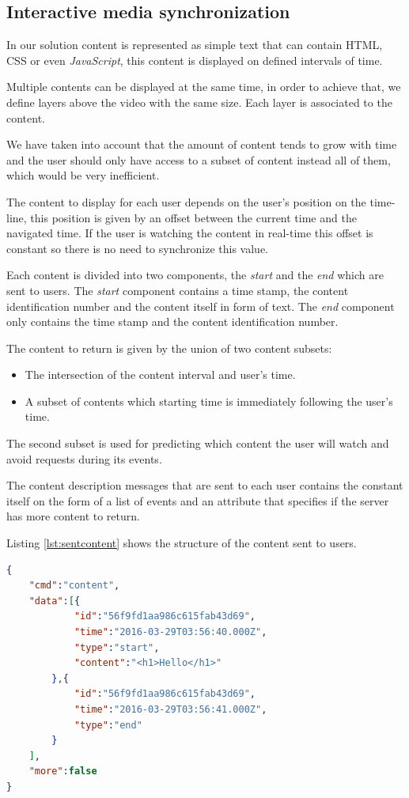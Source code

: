 	\subsection{Interactive media synchronization}

	In our solution content is represented as simple text that can contain \ac{HTML}, \ac{CSS} or even \emph{JavaScript}, this content is displayed on defined intervals of time.

	Multiple contents can be displayed at the same time, in order to achieve that, we define layers above the video with the same size. Each layer is associated to the content.

	We have taken into account that the amount of content tends to grow with time and the user should only have access to a subset of content instead all of them, which would be very inefficient.

	The content to display for each user depends on the user's position on the time-line, this position is given by an offset between the current time and the navigated time. If the user is watching the content in real-time this offset is constant so there is no need to synchronize this value.

	Each content is divided into two components, the \emph{start} and the \emph{end} which are sent to users. The \emph{start} component contains a time stamp, the content identification number and the content itself in form of text. The \emph{end} component only contains the time stamp and the content identification number. 

	The content to return is given by the union of two content subsets:
	\begin{itemize}
		\item The intersection of the content interval and user's time.
		\item A subset of contents which starting time is immediately following the user's time.
	\end{itemize}

	The second subset is used for predicting which content the user will watch and avoid requests during its events.

	The content description messages that are sent to each user contains the constant itself on the form of a list of events and an attribute that specifies if the server has more content to return.

	Listing \ref{lst:sentcontent} shows the structure of the content sent to users.

\begin{minipage}{\linewidth}
\begin{lstlisting}[caption={Exampe of content sent to users},label={lst:sentcontent},language=json]
{
	"cmd":"content",
	"data":[{
			"id":"56f9fd1aa986c615fab43d69",
			"time":"2016-03-29T03:56:40.000Z",
			"type":"start",
			"content":"<h1>Hello</h1>"
		},{
			"id":"56f9fd1aa986c615fab43d69",
			"time":"2016-03-29T03:56:41.000Z",
			"type":"end"
		}
	],
	"more":false
}
\end{lstlisting}
\end{minipage}

